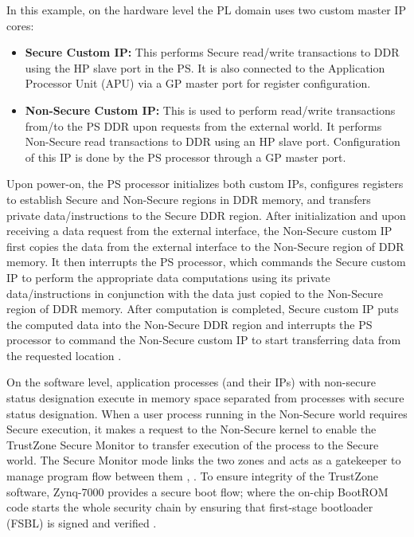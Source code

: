 \documentclass[sigconf]{acmart}
\theoremstyle{plain}
\theoremstyle{remark}
\begin{document}
In this example, on the hardware level the PL domain uses two custom master IP cores:

\begin{itemize}
\item \textbf{Secure Custom IP:}
This performs Secure read/write transactions to DDR using the HP slave port in the PS. It is also connected to the Application Processor Unit (APU) via a GP master port for register configuration.
\item \textbf{Non-Secure Custom IP:}
This is used to perform read/write transactions from/to the PS DDR upon requests from the external world. It performs Non-Secure read transactions to DDR using an HP slave port. Configuration of this IP is done by the PS processor through a GP master port.
\end{itemize}

Upon power-on, the PS processor initializes both custom IPs, configures registers to establish Secure and Non-Secure regions in DDR memory, and transfers private data/instructions to the Secure DDR region. After initialization and upon receiving a data request from the external interface, the Non-Secure custom IP first copies the data from the external interface to the Non-Secure region of DDR memory. It then interrupts the PS processor, which commands the Secure custom IP to perform the appropriate data computations using its private data/instructions in conjunction with the data just copied to the Non-Secure region of DDR memory. After computation is completed, Secure custom IP puts the computed data into the Non-Secure DDR region and interrupts the PS processor to command the Non-Secure custom IP to start transferring data from the requested location \cite{xilinxtrust}.

On the software level, application processes (and their IPs) with non-secure status designation execute in memory space separated from processes with secure status designation. When a user process running in the Non-Secure world requires Secure execution, it makes a request to the Non-Secure kernel to enable the TrustZone Secure Monitor to transfer execution of the process to the Secure world. The Secure Monitor mode links the two zones and acts as a gatekeeper to manage program flow between them \cite{xilinxprotrust}, \cite{xilinxtrust}. To ensure integrity of the TrustZone software, Zynq-7000 provides a secure boot flow; where the on-chip BootROM code starts the whole security chain by ensuring that first-stage bootloader (FSBL) is signed and verified \cite{xilinxtrust}.
\end{document}
